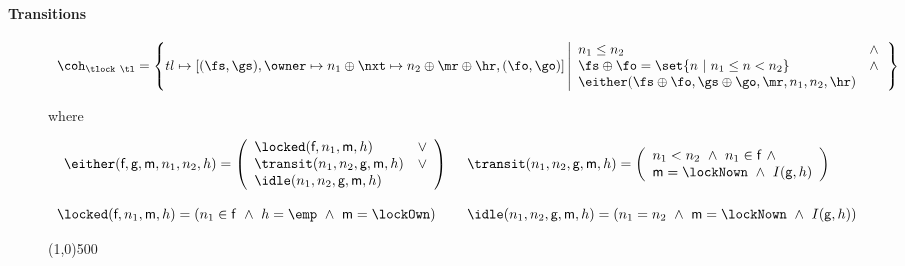 \paragraph{Transitions}
\label{sec:transitions}


\begin{figure*}
\small

\vspace{-12pt}

\[
\begin{array}{l}
\coh_{\tlock~\tl} = 
\left\{
tl \mapsto [(\fs, \gs), \owner \mapsto n_1 \oplus \nxt \mapsto n_2
\oplus \mr \oplus \hr, (\fo, \go)] 
\left|
\begin{array}{lc}
n_1 \le n_2 & \wedge  \\
\fs \oplus \fo = \set{n ~|~ n_1 \le n < n_2}  & \wedge  \\
\either (\fs \oplus \fo, \gs \oplus \go, \mr, n_1, n_2, \hr) 
\end{array} 
\right. \right\} 
\end{array}
\]

where
\vspace{-18pt}

\[
\begin{array}{ll}
\begin{array}{l}
\either(\textsf{f}, \textsf{g}, \textsf{m}, n_1, n_2, h)  = 
\left(
\begin{array}{ll}
\locked(\textsf{f}, n_1, \textsf{m}, h) & \vee \\
\transit(n_1, n_2, \textsf{g}, \textsf{m}, h) & \vee  \\
\idle(n_1, n_2, \textsf{g}, \textsf{m}, h) 
\end{array}
\right)
\end{array}
&
\transit(n_1, n_2, \textsf{g}, \textsf{m}, h) =
\left(
\begin{array}{l}
n_1 < n_2 ~\wedge~ n_1 \in \mathsf{f} ~\wedge~ \\
\textsf{m} = \lockNown ~\wedge~ I(\mathsf{g}, h)
\end{array}
\right)
\\ 
\\
\locked(\textsf{f}, n_1, \textsf{m}, h) =
(n_1 \in \mathsf{f} ~\wedge~ h = \emp ~\wedge~ \textsf{m} = \lockOwn)
&
\idle(n_1, n_2, \textsf{g}, \textsf{m}, h) =
(n_1 = n_2 ~\wedge~ \textsf{m} = \lockNown ~\wedge~ I(\mathsf{g}, h))
\end{array}
\]

\line(1,0){500}
\vspace{5pt}


\end{figure*}
